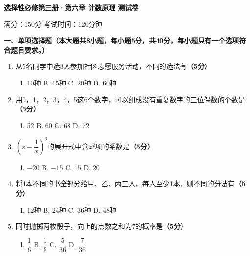 \documentclass[12pt, a4paper]{ctexart}
\newcommand{\score}[1]{\hfill\textbf{（#1分）}}
\begin{document}
\begin{center}
\Large\textbf{选择性必修第三册·第六章 计数原理 测试卷}

\vspace{0.3cm}
\normalsize 满分：150分 \quad 考试时间：120分钟
\end{center}

\vspace{0.5cm}

\noindent\textbf{一、单项选择题（本大题共8小题，每小题5分，共40分。每小题只有一个选项符合题目要求。）}

\vspace{0.3cm}

\begin{enumerate}[label=\textbf{\arabic*.}, leftmargin=2em]

\item 从5名同学中选3人参加社区志愿服务活动，不同的选法有\score{5}
\begin{enumerate}[label=\Alph*., leftmargin=2em]
\item 10种 \quad B. 15种 \quad C. 20种 \quad D. 60种
\end{enumerate}

\item 用0，1，2，3，4，5这6个数字，可以组成没有重复数字的三位偶数的个数是\score{5}
\begin{enumerate}[label=\Alph*., leftmargin=2em]
\item 52 \quad B. 60 \quad C. 68 \quad D. 72
\end{enumerate}

\item $\left(x-\dfrac{1}{x}\right)^6$的展开式中含$x^2$项的系数是\score{5}
\begin{enumerate}[label=\Alph*., leftmargin=2em]
\item $-20$ \quad B. $-15$ \quad C. $15$ \quad D. $20$
\end{enumerate}

\item 将4本不同的书全部分给甲、乙、丙三人，每人至少1本，则不同的分法有\score{5}
\begin{enumerate}[label=\Alph*., leftmargin=2em]
\item 12种 \quad B. 24种 \quad C. 36种 \quad D. 48种
\end{enumerate}

\item 同时抛掷两枚骰子，向上的点数之和为7的概率是\score{5}
\begin{enumerate}[label=\Alph*., leftmargin=2em]
\item $\dfrac{1}{6}$ \quad B. $\dfrac{1}{8}$ \quad C. $\dfrac{5}{36}$ \quad D. $\dfrac{7}{36}$
\end{enumerate}


\end{enumerate}
\end{document}
